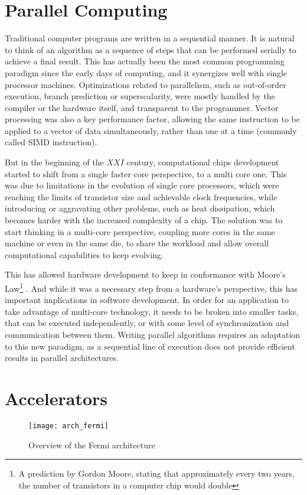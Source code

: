 \documentclass[main.tex]{subfiles}
\begin{document}
\section{Parallel Computing}

Traditional computer programs are written in a sequential manner. It is natural to think of an algorithm as a sequence of steps that can be performed serially to achieve a final result. This has actually been the most common programming paradigm since the early days of computing, and it synergizes well with single processor machines. Optimizations related to parallelism, such as out-of-order execution, branch prediction or superscalarity, were mostly handled by the compiler or the hardware itself, and transparent to the programmer. Vector processing was also a key performance factor, allowing the same instruction to be applied to a vector of data simultaneously, rather than one at a time (commonly called \ac{SIMD} instruction).

But in the beginning of the $XXI$ century, computational chips development started to shift from a single faster core perspective, to a multi core one. This was due to limitations in the evolution of single core processors, which were reaching the limits of transistor size and achievable clock frequencies, while introducing or aggravating other problems, such as heat dissipation, which becomes harder with the increased complexity of a chip. The solution was to start thinking in a multi-core perspective, coupling more cores in the same machine or even in the same die, to share the workload and allow overall computational capabilities to keep evolving.

This has allowed hardware development to keep in conformance with Moore's Law\footnote{A prediction by Gordon Moore, stating that approximately every two years, the number of transistors in a computer chip would double} . And while it was a necessary step from a hardware's perspective, this has important implications in software development. In order for an application to take advantage of multi-core technology, it needs to be broken into smaller tasks, that can be executed independently, or with some level of synchronization and communication between them. Writing parallel algorithms requires an adaptation to this new paradigm, as a sequential line of execution does not provide efficient results in parallel architectures.

\section{Accelerators}

\begin{figure}
  \centering
  \texttt{[image: arch\_fermi]}
  \caption{Overview of the Fermi architecture \label{fig:fermi}}
\end{figure}

\end{document}

